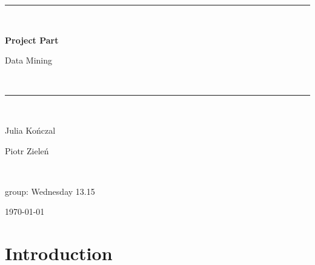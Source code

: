 \documentclass[11pt,a4paper]{article}\usepackage[]{graphicx}\usepackage[]{xcolor}
\newcommand{\RomanNumeralCaps}[1]
    {\MakeUppercase{\romannumeral #1}}
\begin{document}
	
	
	\begin{titlepage} 
		\newcommand{\HRule}{\rule{\linewidth}{0.5mm}} 
		
		\center 
		
		
		
		\HRule\\[0.4cm]
		
		{\huge\bfseries Project Part \RomanNumeralCaps{2}

			
			Data Mining}\\[0.4cm] 
		
		\HRule\\[1.5cm]
		
		
		\begin{minipage}{0.4\textwidth}
			\begin{flushleft}
				\large
				
				Julia Kończal
				
				Piotr Zieleń 
			\end{flushleft}
		\end{minipage}
		~
		\begin{minipage}{0.4\textwidth}
			\begin{flushright}
				\large
				group: Wednesday 13.15
				
				
				
				
				
				
				
				
				
			\end{flushright}
		\end{minipage}
		
		
		
		\vfill\vfill\vfill 	\vspace{400px}
		
		
		{\large \today} 
		
		\vfill 
		
	\end{titlepage}
	
	\newpage
	
	\newpage
	
	\tableofcontents
	\newpage
	\section{Introduction}

	
\end{document}
